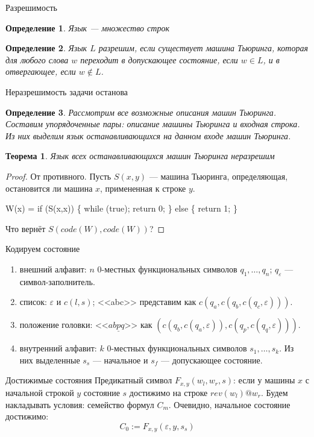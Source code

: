 \documentclass[handout]{beamer}
\newtheorem{thm}{Теорема}[section]
\newtheorem{dfn}{Определение}[section]
\begin{document}
\begin{frame}{Разрешимость}
\begin{dfn}Язык --- множество строк\end{dfn}
\begin{dfn}Язык $L$ разрешим, если существует машина Тьюринга, которая для любого слова $w$ переходит в допускающее состояние, если $w \in L$,
и в отвергающее, если $w \notin L$.\end{dfn}
\end{frame}

\begin{frame}{Неразрешимость задачи останова}
\begin{dfn}Рассмотрим все возможные описания машин Тьюринга. Составим упорядоченные пары: описание машины Тьюринга и входная строка.
Из них выделим язык останавливающихся на данном входе машин Тьюринга.\end{dfn}
\begin{thm}Язык всех останавливающихся машин Тьюринга неразрешим\end{thm}
\begin{proof}От противного. Пусть $S(x,y)$ --- машина Тьюринга, определяющая, остановится ли машина $x$, примененная к строке $y$.\pause
\begin{center}W(x) = if (S(x,x)) \{ while (true); return 0; \} else \{ return 1; \}\end{center}\pause
Что вернёт $S(code(W),code(W))$?
\end{proof}
\end{frame}

\begin{frame}{Кодируем состояние}
\begin{enumerate}
\item внешний алфавит: $n$ 0-местных функциональных символов $q_1, \dots, q_n$; $q_\varepsilon$ --- символ-заполнитель.
\item список: $\varepsilon$ и $c(l,s)$; <<abc>> представим как $c(q_a,c(q_b,c(q_c,\varepsilon)))$.
\item положение головки: <<$ab\underline{p}q$>> как $(c(q_b,c(q_a,\varepsilon)), c(q_p,c(q_q,\varepsilon)))$.
\item внутренний алфавит: $k$ 0-местных функциональных символов $s_1, \dots, s_k$. Из них выделенные $s_s$ --- начальное и
$s_f$ --- допускающее состояние.
\end{enumerate}
\end{frame}

\begin{frame}{Достижимые состояния}
Предикатный символ $F_{x,y}(w_l,w_r,s)$: если у машины $x$ с начальной строкой $y$ состояние $s$ достижимо на строке $rev(w_l) @ w_r$. 
\pause
Будем накладывать условия: семейство формул $C_m$. \pause
Очевидно, начальное состояние достижимо:
$$C_0 := F_{x,y}(\varepsilon,y,s_s)$$
\end{frame}
\end{document}
